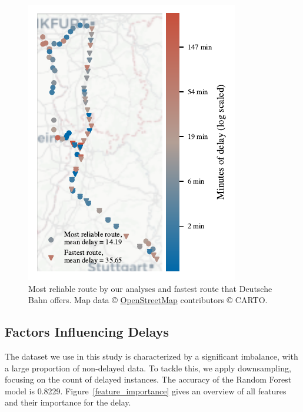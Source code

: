 \documentclass{article}
\theoremstyle{plain}
\theoremstyle{definition}
\theoremstyle{remark}
\begin{document}
	\begin{figure}[h] %
		\includegraphics{./fig/maps_KI_03_reliable_vs_fastest_zoomed_Carto.pdf} %
		\caption{Most reliable route by our analyses and fastest route that Deutsche Bahn offers. Map data © \href{https://www.openstreetmap.org/}{OpenStreetMap} contributors © CARTO.}
		\label{rel_fast_zoomed}
	\end{figure}
	
	\subsection{Factors Influencing Delays}\label{sec:results_ext}
	
	The dataset we use in this study is characterized by a significant imbalance, with a large proportion of non-delayed data. To tackle this, we apply downsampling, focusing on the count of delayed instances. The accuracy of the Random Forest model is 0.8229. Figure~\ref{feature_importance} gives an overview of all features and their importance for the delay.
	
\end{document}
